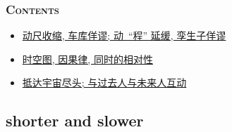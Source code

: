 \documentclass[aspectratio=169, 10pt, utf8, mathserif]{beamer}
\numberwithin{equation}{section} %
\numberwithin{figure}{section} %
\begin{document}
\begin{frame}%
    \frametitle{\textsc{Contents}} \vspace{-0.85cm}\label{sec:3}
    \begin{multicols}{2}
    \begin{minipage}[t]{0.55\textwidth}
    \end{minipage}

    \begin{minipage}[t]{0.55\textwidth}
    \vspace{0.6cm}
    \begin{spacing}{0.9} %
    \begin{itemize}
        \item\hyperlink{subsec:3-1}{动尺收缩, 车库佯谬; 动~``程'' 延缓, 孪生子佯谬}
        \item\hyperlink{subsec:3-2}{时空图, 因果律, 同时的相对性}
        \item\hyperlink{subsec:3-3}{抵达宇宙尽头; 与过去人与未来人互动}
    \end{itemize}
    \end{spacing}
    \end{minipage}
    \end{multicols}
\end{frame}

\subsection[动尺收缩]{shorter and slower}\label{subsec:3-1}
\end{document}
